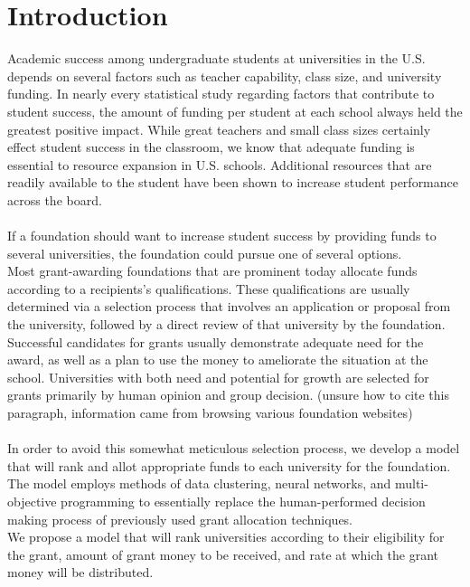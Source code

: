 \documentclass[paper.tex]{subfiles}
\begin{document}
	\section{Introduction}
	Academic success among undergraduate students at universities in the U.S. depends on several factors such as teacher capability, class size, and university funding. In nearly every statistical study regarding factors that contribute to student success, the amount of funding per student at each school always held the greatest positive impact. While great teachers and small class sizes certainly effect student success in the classroom, we know that adequate funding is essential to resource expansion in U.S. schools. Additional resources that are readily available to the student have been shown to increase student performance across the board.\cite{greenwald1996effect}  
	\\\\
	If a foundation should want to increase student success by providing funds to several universities, the foundation could pursue one of several options.
	\\
	Most grant-awarding foundations that are prominent today allocate funds according to a recipients's qualifications. These qualifications are usually determined via a selection process that involves an application or proposal from the university, followed by a direct review of that university by the foundation. Successful candidates for grants usually demonstrate adequate need for the award, as well as a plan to use the money to ameliorate the situation at the school. Universities with both need and potential for growth are selected for grants primarily by human opinion and group decision. (unsure how to cite this paragraph, information came from browsing various foundation websites)
	\\
	\\
	In order to avoid this somewhat meticulous selection process, we develop a model that will rank and allot appropriate funds to each university for the foundation. The model employs methods of data clustering, neural networks, and multi-objective programming to essentially replace the human-performed decision making process of previously used grant allocation techniques.
	\\
	We propose a model that will rank universities according to their eligibility for the grant, amount of grant money to be received, and rate at which the grant money will be distributed.
	
	
	
\end{document}
